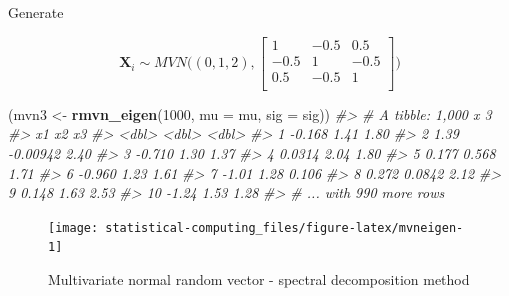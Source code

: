 \documentclass[]{book}
\newenvironment{Shaded}{\begin{snugshade}}{\end{snugshade}}
\newcommand{\CommentTok}[1]{\textcolor[rgb]{0.56,0.35,0.01}{\textit{#1}}}
\newcommand{\DataTypeTok}[1]{\textcolor[rgb]{0.13,0.29,0.53}{#1}}
\newcommand{\DecValTok}[1]{\textcolor[rgb]{0.00,0.00,0.81}{#1}}
\newcommand{\KeywordTok}[1]{\textcolor[rgb]{0.13,0.29,0.53}{\textbf{#1}}}
\newcommand{\NormalTok}[1]{#1}
\newcommand{\OperatorTok}[1]{\textcolor[rgb]{0.81,0.36,0.00}{\textbf{#1}}}
\newcommand{\StringTok}[1]{\textcolor[rgb]{0.31,0.60,0.02}{#1}}
\theoremstyle{definition}
\theoremstyle{definition}
\theoremstyle{definition}
\theoremstyle{remark}
\begin{document}
Generate

\[\mathbf{X}_i \sim MVN\bigg((0, 1, 2), \begin{bmatrix} 1&-0.5&0.5 \\ -0.5&1&-0.5 \\ 0.5&-0.5&1 \\ \end{bmatrix}\bigg)\]

\begin{Shaded}
\begin{Highlighting}[]
\NormalTok{(mvn3 <-}\StringTok{ }\KeywordTok{rmvn_eigen}\NormalTok{(}\DecValTok{1000}\NormalTok{, }\DataTypeTok{mu =}\NormalTok{ mu, }\DataTypeTok{sig =}\NormalTok{ sig))}
\CommentTok{#> # A tibble: 1,000 x 3}
\CommentTok{#>         x1       x2    x3}
\CommentTok{#>      <dbl>    <dbl> <dbl>}
\CommentTok{#>  1 -0.168   1.41    1.80 }
\CommentTok{#>  2  1.39   -0.00942 2.40 }
\CommentTok{#>  3 -0.710   1.30    1.37 }
\CommentTok{#>  4  0.0314  2.04    1.80 }
\CommentTok{#>  5  0.177   0.568   1.71 }
\CommentTok{#>  6 -0.960   1.23    1.61 }
\CommentTok{#>  7 -1.01    1.28    0.106}
\CommentTok{#>  8  0.272   0.0842  2.12 }
\CommentTok{#>  9  0.148   1.63    2.53 }
\CommentTok{#> 10 -1.24    1.53    1.28 }
\CommentTok{#> # ... with 990 more rows}
\end{Highlighting}
\end{Shaded}

\begin{Shaded}
\end{Shaded}

\begin{figure}[H]

{\centering \texttt{[image: statistical-computing\_files/figure-latex/mvneigen-1]} 

}

\caption{Multivariate normal random vector - spectral decomposition method}\label{fig:mvneigen}
\end{figure}
\end{document}
